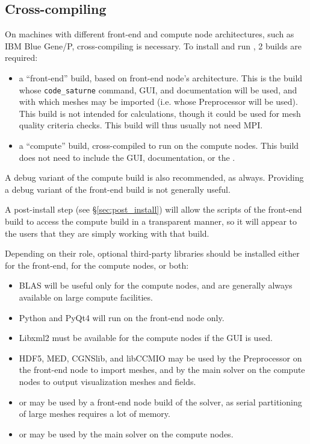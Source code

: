 \documentclass[a4paper,10pt,twoside]{csshortdoc}
\begin{document}
\subsection{Cross-compiling}

On machines with different front-end and compute node architectures,
such as IBM Blue Gene/P, cross-compiling is necessary.
To install and run \CS, 2 builds are required:

\begin{itemize}
\item a ``front-end'' build, based on front-end node's architecture. This is
      the build whose \texttt{code\_saturne} command, GUI, and documentation
      will be used, and with which meshes may be imported (i.e. whose
      Preprocessor will be used). This build is not intended for calculations,
      though it could be used for mesh quality criteria checks.
      This build will thus usually not need  MPI.
\item a ``compute'' build, cross-compiled to run on the compute nodes.
      This build does not need to include the GUI, documentation, or
      the \pcs.
\end{itemize}

A debug variant of the compute build is also recommended, as always.
Providing a debug variant of the front-end build is not generally useful.

A post-install step (see \S\ref{sec:post_install}) will allow
the scripts of the front-end build to access the compute build in a transparent
manner, so it will appear to the users that they are simply working with that
build.

Depending on their role, optional third-party libraries should be installed
either for the front-end, for the compute nodes, or both:

\begin{itemize}
\item BLAS will be useful only for the compute nodes, and are generally
      always available on large compute facilities.
\item Python and PyQt4 will run on the front-end node only.
\item Libxml2 must be available for the compute nodes if the GUI is used.
\item HDF5, MED, CGNSlib, and libCCMIO may be used by the Preprocessor on
      the front-end node to import meshes, and by the main solver on the
      compute nodes to output visualization meshes and fields.
\item \scotch or \metis may be used by a front-end node build of the
      solver, as serial partitioning of large meshes requires a lot of memory.
\item \ptscotch or \parmetis may be used by the main solver on the
      compute nodes.
\end{itemize}
\end{document}

